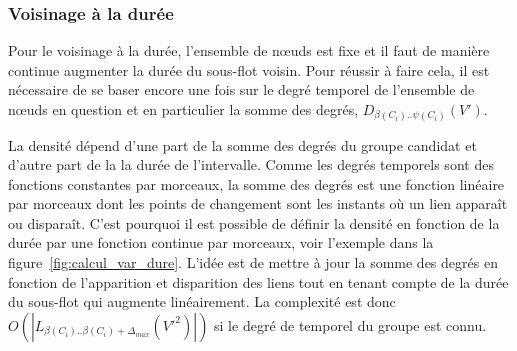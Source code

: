 \subsubsection{Voisinage à la durée}
Pour le voisinage à la durée, l'ensemble de n\oe{}uds est fixe et il faut de manière continue augmenter la durée du sous-flot voisin.
Pour réussir à faire cela, il est nécessaire de se baser encore une fois sur le degré temporel de l'ensemble de n\oe{}uds en question et en particulier la somme des degrés, $D_{\beta(C_i)..\psi(C_i)}(V')$.

La densité dépend d'une part de la somme des degrés du groupe candidat et d'autre part de la la durée de l'intervalle.
Comme les degrés temporels sont des fonctions constantes par morceaux, la somme des degrés est une fonction linéaire par morceaux dont les points de changement sont les instants où un lien apparaît ou disparaît.
C'est pourquoi il est possible de définir la densité en fonction de la durée par une fonction continue par morceaux, voir l'exemple dans la figure~\ref{fig:calcul_var_dure}.
L'idée est de mettre à jour la somme des degrés en fonction de l'apparition et disparition des liens tout en tenant compte de la durée du sous-flot qui augmente linéairement.
La complexité est donc $O(|L_{\beta(C_i)..\beta(C_i)+\Delta_{max}}(V'^2)|)$ si le degré de temporel du groupe est connu.

